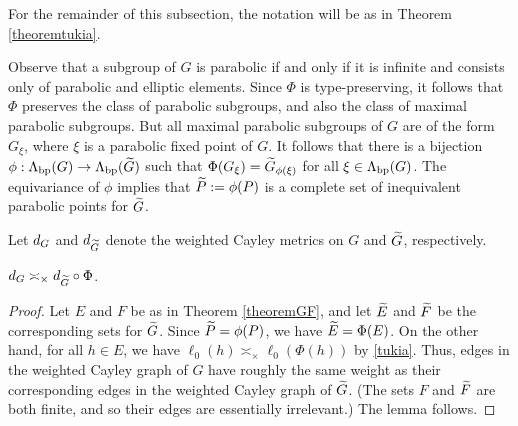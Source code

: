 {For the remainder of this subsection, the notation will be as in Theorem \ref{theoremtukia}.

Observe that a subgroup of $G$ is parabolic if and only if it is infinite and consists only of parabolic and elliptic elements. Since $\Phi$ is type-preserving, it follows that $\Phi$ preserves the class of parabolic subgroups, and also the class of maximal parabolic subgroups. But all maximal parabolic subgroups of $G$ are of the form $G_\xi$, where $\xi$ is a parabolic fixed point of $G$. It follows that there is a bijection $\phi:\Lambda_{\mathrm{bp}}(G)\to\Lambda_{\mathrm{bp}}(\widetilde G)$ such that $\Phi(G_\xi) = \widetilde G_{\phi(\xi)}$ for all $\xi\in\Lambda_{\mathrm{bp}}(G)$. The equivariance of $\phi$ implies that $\widetilde P := \phi(P)$ is a complete set of inequivalent parabolic points for $\widetilde G$.

Let $d_G$ and $d_{\widetilde G}$ denote the weighted Cayley metrics on $G$ and $\widetilde G$, respectively.

\begin{lemma}
\label{lemmatukia1}
$d_G \asymp_\times d_{\widetilde G}\circ\Phi$.
\end{lemma}
\begin{proof}
Let $E$ and $F$ be as in Theorem \ref{theoremGF}, and let $\widetilde E$ and $\widetilde F$ be the corresponding sets for $\widetilde G$. Since $\widetilde P = \phi(P)$, we have $\widetilde E = \Phi(E)$. On the other hand, for all $h\in E$, we have $\ell_0(h) \asymp_\times \ell_0(\Phi(h))$ by \eqref{tukia}. Thus, edges in the weighted Cayley graph of $G$ have roughly the same weight as their corresponding edges in the weighted Cayley graph of $\widetilde G$. (The sets $F$ and $\widetilde F$ are both finite, and so their edges are essentially irrelevant.) The lemma follows.
\end{proof}

}

